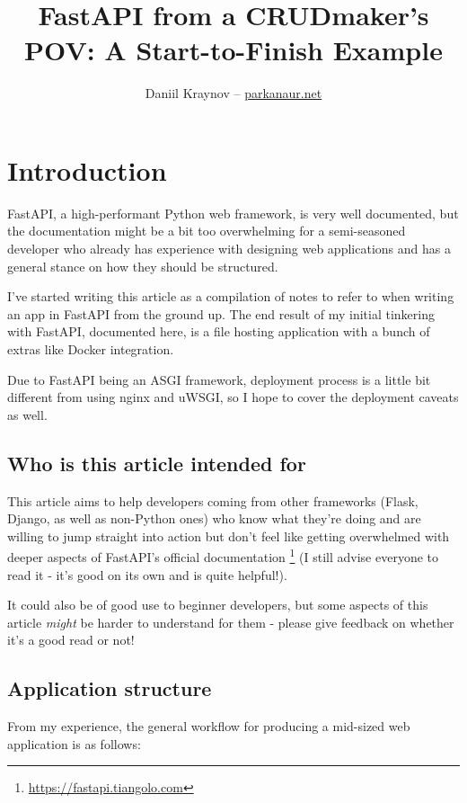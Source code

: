 \documentclass[14pt]{extarticle}
\title{FastAPI from a CRUDmaker's POV: A Start-to-Finish Example}
\author{Daniil Kraynov -- \href{https://parkanaur.net}{parkanaur.net}}
\newcommand{\flink}[1]{\footnote{\href{#1}{#1}}}
\begin{document}
\maketitle

{\hypersetup{linkcolor=black}
\tableofcontents}

\section{Introduction}

FastAPI, a high-performant Python web framework, is very well documented, but the documentation might be a bit too overwhelming for a semi-seasoned developer who already has experience with designing web applications and has a general stance on how they should be structured.

I've started writing this article as a compilation of notes to refer to when writing an app in FastAPI from the ground up. The end result of my initial tinkering with FastAPI, documented here, is a file hosting application with a bunch of extras like Docker integration.

Due to FastAPI being an ASGI framework, deployment process is a little bit different from using nginx and uWSGI, so I hope to cover the deployment caveats as well.

\subsection{Who is this article intended for}

This article aims to help developers coming from other frameworks (Flask, Django, as well as non-Python ones) who know what they're doing and are willing to jump straight into action but don't feel like getting overwhelmed with deeper aspects of FastAPI's official documentation \flink{https://fastapi.tiangolo.com} (I still advise everyone to read it - it's good on its own and is quite helpful!).

It could also be of good use to beginner developers, but some aspects of this article \textit{might} be harder to understand for them - please give feedback on whether it's a good read or not!

\subsection{Application structure}

From my experience, the general workflow for producing a mid-sized web application is as follows:
\end{document}
